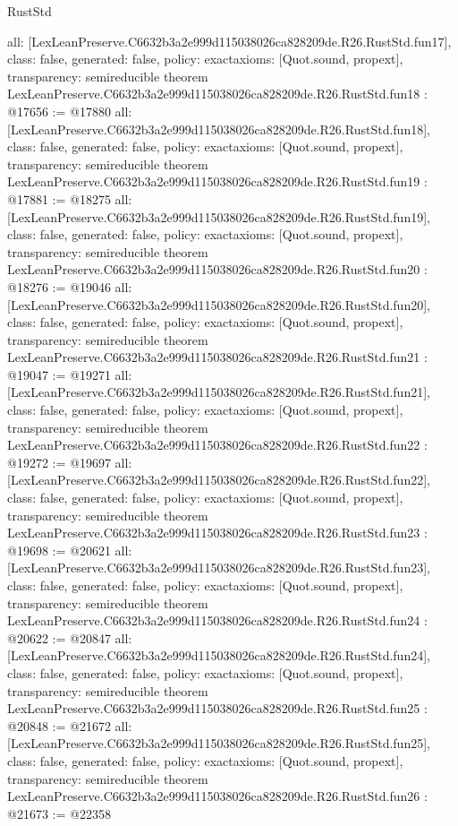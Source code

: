 \begin{lexlean}{RustStd}
\begin{coremodule}
{  all: [LexLeanPreserve.C6632b3a2e999d115038026ca828209de.R26.RustStd.fun17],
  class: false,
  generated: false,
  policy: exact{axioms: [Quot.sound, propext]},
  transparency: semireducible
}
theorem LexLeanPreserve.C6632b3a2e999d115038026ca828209de.R26.RustStd.fun18 : @17656 := @17880 {
  all: [LexLeanPreserve.C6632b3a2e999d115038026ca828209de.R26.RustStd.fun18],
  class: false,
  generated: false,
  policy: exact{axioms: [Quot.sound, propext]},
  transparency: semireducible
}
theorem LexLeanPreserve.C6632b3a2e999d115038026ca828209de.R26.RustStd.fun19 : @17881 := @18275 {
  all: [LexLeanPreserve.C6632b3a2e999d115038026ca828209de.R26.RustStd.fun19],
  class: false,
  generated: false,
  policy: exact{axioms: [Quot.sound, propext]},
  transparency: semireducible
}
theorem LexLeanPreserve.C6632b3a2e999d115038026ca828209de.R26.RustStd.fun20 : @18276 := @19046 {
  all: [LexLeanPreserve.C6632b3a2e999d115038026ca828209de.R26.RustStd.fun20],
  class: false,
  generated: false,
  policy: exact{axioms: [Quot.sound, propext]},
  transparency: semireducible
}
theorem LexLeanPreserve.C6632b3a2e999d115038026ca828209de.R26.RustStd.fun21 : @19047 := @19271 {
  all: [LexLeanPreserve.C6632b3a2e999d115038026ca828209de.R26.RustStd.fun21],
  class: false,
  generated: false,
  policy: exact{axioms: [Quot.sound, propext]},
  transparency: semireducible
}
theorem LexLeanPreserve.C6632b3a2e999d115038026ca828209de.R26.RustStd.fun22 : @19272 := @19697 {
  all: [LexLeanPreserve.C6632b3a2e999d115038026ca828209de.R26.RustStd.fun22],
  class: false,
  generated: false,
  policy: exact{axioms: [Quot.sound, propext]},
  transparency: semireducible
}
theorem LexLeanPreserve.C6632b3a2e999d115038026ca828209de.R26.RustStd.fun23 : @19698 := @20621 {
  all: [LexLeanPreserve.C6632b3a2e999d115038026ca828209de.R26.RustStd.fun23],
  class: false,
  generated: false,
  policy: exact{axioms: [Quot.sound, propext]},
  transparency: semireducible
}
theorem LexLeanPreserve.C6632b3a2e999d115038026ca828209de.R26.RustStd.fun24 : @20622 := @20847 {
  all: [LexLeanPreserve.C6632b3a2e999d115038026ca828209de.R26.RustStd.fun24],
  class: false,
  generated: false,
  policy: exact{axioms: [Quot.sound, propext]},
  transparency: semireducible
}
theorem LexLeanPreserve.C6632b3a2e999d115038026ca828209de.R26.RustStd.fun25 : @20848 := @21672 {
  all: [LexLeanPreserve.C6632b3a2e999d115038026ca828209de.R26.RustStd.fun25],
  class: false,
  generated: false,
  policy: exact{axioms: [Quot.sound, propext]},
  transparency: semireducible
}
theorem LexLeanPreserve.C6632b3a2e999d115038026ca828209de.R26.RustStd.fun26 : @21673 := @22358 {
}
\end{coremodule}
\end{lexlean}
